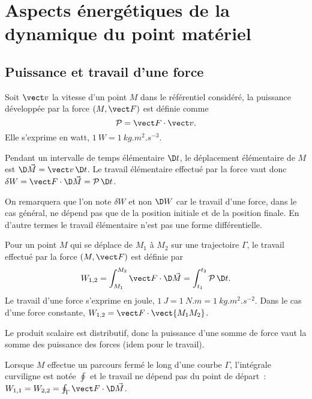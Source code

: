 \chapter{Aspects énergétiques de la dynamique du point matériel}
\label{chap:aspectenergetiques}
\minitoc
\minilof
\minilot

\section{Puissance et travail d'une force}
\label{chap4-sec:puissanceettravail}

\begin{defdef}[Puissance]
  Soit $\vv$ la vitesse d'un point $M$ dans le référentiel considéré, la puissance développée par la force $(M, \vF)$ est définie comme
  \begin{equation}
    \P=\vF \cdot \vv.
  \end{equation}
  Elle s'exprime en watt, $\SI{1}{W}=\SI{1}{kg.m^2.s^{-3}}$.
\end{defdef}
 Pendant un intervalle de temps élémentaire $\diff t$, le déplacement élémentaire de $M$ est $\diff \vec{M} = \vv \diff t$. Le travail élémentaire effectué par la force vaut donc $\delta W = \vF \cdot \diff \vec{M} = \P \diff t$.

On remarquera que l'on note $\delta W$ et non $\diff W$ car le travail d'une force, dans le cas général, ne dépend pas que de la position initiale et de la position finale. En d'autre termes le travail élémentaire n'est pas une forme différentielle.
\begin{defdef}[Travail]
  Pour un point $M$ qui se déplace de $M_1$ à $M_2$ sur une trajectoire $\Gamma$, le travail effectué par la force $(M, \vF)$ est définie par
\begin{equation}
  W_{1, 2} = \int_{M_1}^{M_2} \vF \cdot \diff \vec{M} = \int_{t_1}^{t_2} \P \diff t.
\end{equation}
Le travail d'une force s'exprime en joule, $\SI{1}{J}=\SI{1}{N.m}=\SI{1}{kg.m^2.s^{-2}}$. Dans le cas d'une force constante, $W_{1, 2}=\vF \cdot \vect{M_1M_2}$.
\end{defdef}
 Le produit scalaire est distributif, donc la puissance d'une somme de force vaut la somme des puissance des forces (idem pour le travail).

Lorsque $M$ effectue un parcours fermé le long d'une courbe $\Gamma$, l'intégrale curviligne est notée $\oint$ et le travail ne dépend pas du point de départ~: $W_{1,1} = W_{2,2} = \oint_\Gamma \vF \cdot \diff \vec{M}$.

